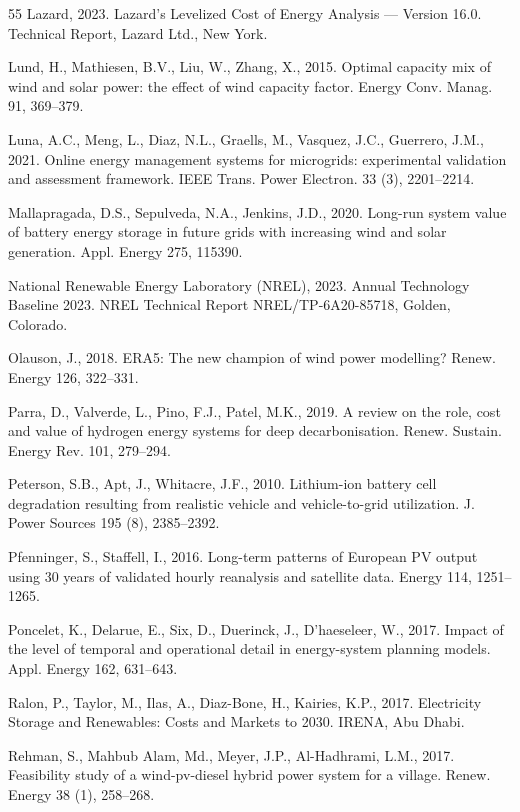 \documentclass[11pt,a4paper]{article}
\begin{document}
\begin{thebibliography}{55}
Lazard, 2023.
Lazard's Levelized Cost of Energy Analysis --- Version 16.0.
Technical Report, Lazard Ltd., New York.

Lund, H., Mathiesen, B.V., Liu, W., Zhang, X., 2015.
Optimal capacity mix of wind and solar power: the effect of wind capacity factor.
Energy Conv. Manag. 91, 369--379.

Luna, A.C., Meng, L., Diaz, N.L., Graells, M., Vasquez, J.C., Guerrero, J.M., 2021.
Online energy management systems for microgrids: experimental validation and assessment framework.
IEEE Trans. Power Electron. 33 (3), 2201--2214.

Mallapragada, D.S., Sepulveda, N.A., Jenkins, J.D., 2020.
Long-run system value of battery energy storage in future grids with increasing wind and solar generation.
Appl. Energy 275, 115390.

National Renewable Energy Laboratory (NREL), 2023.
Annual Technology Baseline 2023.
NREL Technical Report NREL/TP-6A20-85718, Golden, Colorado.

Olauson, J., 2018.
ERA5: The new champion of wind power modelling?
Renew. Energy 126, 322--331.

Parra, D., Valverde, L., Pino, F.J., Patel, M.K., 2019.
A review on the role, cost and value of hydrogen energy systems for deep decarbonisation.
Renew. Sustain. Energy Rev. 101, 279--294.

Peterson, S.B., Apt, J., Whitacre, J.F., 2010.
Lithium-ion battery cell degradation resulting from realistic vehicle and vehicle-to-grid utilization.
J. Power Sources 195 (8), 2385--2392.

Pfenninger, S., Staffell, I., 2016.
Long-term patterns of European PV output using 30 years of validated hourly reanalysis and satellite data.
Energy 114, 1251--1265.

Poncelet, K., Delarue, E., Six, D., Duerinck, J., D'haeseleer, W., 2017.
Impact of the level of temporal and operational detail in energy-system planning models.
Appl. Energy 162, 631--643.

Ralon, P., Taylor, M., Ilas, A., Diaz-Bone, H., Kairies, K.P., 2017.
Electricity Storage and Renewables: Costs and Markets to 2030.
IRENA, Abu Dhabi.

Rehman, S., Mahbub Alam, Md., Meyer, J.P., Al-Hadhrami, L.M., 2017.
Feasibility study of a wind-pv-diesel hybrid power system for a village.
Renew. Energy 38 (1), 258--268.


\end{thebibliography}
\end{document}
